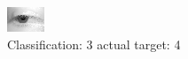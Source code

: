 \begin{figure}[h!]
\begin{center}
\includegraphics[width=0.60\columnwidth]{figures/ID2669_class_3_target_4.png}
\end{center}
\caption{ Classification: 3 actual target: 4}
\label{fig:ID2669_class_3_target_4}
\end{figure}
